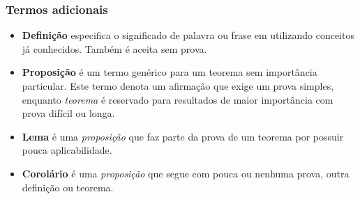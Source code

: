     \hypertarget{termos-adicionais}{%
\subsubsection{Termos adicionais}\label{termos-adicionais}}

\begin{itemize}
\item
  \textbf{Definição} especifica o significado de palavra ou frase em
  utilizando conceitos já conhecidos. Também é aceita sem prova.
\item
  \textbf{Proposição} é um termo genérico para um teorema sem
  importância particular. Este termo denota um afirmação que exige um
  prova simples, enquanto \emph{teorema} é reservado para resultados de
  maior importância com prova difícil ou longa.
\item
  \textbf{Lema} é uma \emph{proposição} que faz parte da prova de um
  teorema por possuir pouca aplicabilidade.
\item
  \textbf{Corolário} é uma \emph{proposição} que segue com pouca ou
  nenhuma prova, outra definição ou teorema.
\end{itemize}

